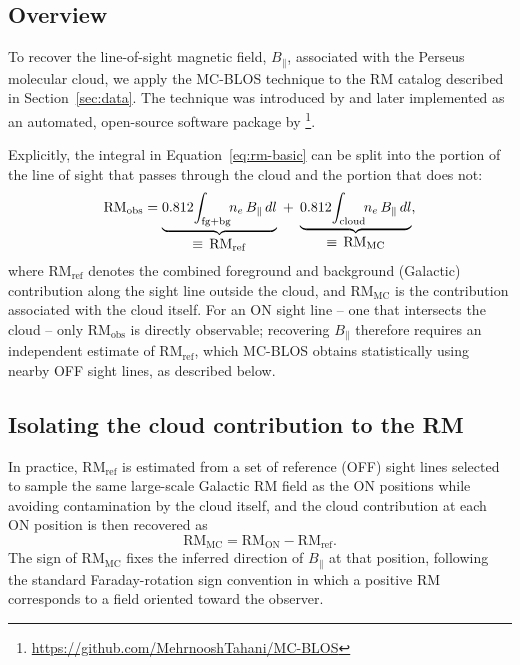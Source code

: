 \documentclass[twocolumn]{aastex631}
\begin{document}
\subsection{Overview}

To recover the line-of-sight magnetic field, $B_\parallel$, associated with the Perseus molecular cloud, we apply the MC-BLOS technique to the RM catalog described in Section~\ref{sec:data}. The technique was introduced by \citet{tahani2018} and later implemented as an automated, open-source software package by \citet{tahani2025mcblos}\footnote{\url{https://github.com/MehrnooshTahani/MC-BLOS}}.

Explicitly, the integral in Equation~\ref{eq:rm-basic} can be split into the portion of the line of sight that passes through the cloud and the portion that does not:
\begin{equation}
\label{eq:rm-split}
    \mathrm{RM_{obs}} = \underbrace{0.812\!\int_{\rm fg+bg}\!\! n_e\, B_\parallel \, dl}_{\displaystyle \equiv\, \mathrm{RM_{ref}}} \;+\; \underbrace{0.812\!\int_{\rm cloud}\!\! n_e\, B_\parallel \, dl}_{\displaystyle \equiv\, \mathrm{RM_{MC}}},
\end{equation}
where $\mathrm{RM_{ref}}$ denotes the combined foreground and background (Galactic) contribution along the sight line outside the cloud, and $\mathrm{RM_{MC}}$ is the contribution associated with the cloud itself. For an ON sight line -- one that intersects the cloud -- only $\mathrm{RM_{obs}}$ is directly observable; recovering $B_\parallel$ therefore requires an independent estimate of $\mathrm{RM_{ref}}$, which MC-BLOS obtains statistically using nearby OFF sight lines, as described below.

\subsection{Isolating the cloud contribution to the RM}
\label{sec:method-rmref}

In practice, $\mathrm{RM_{ref}}$ is estimated from a set of reference (OFF) sight lines selected to sample the same large-scale Galactic RM field as the ON positions while avoiding contamination by the cloud itself, and the cloud contribution at each ON position is then recovered as
\begin{equation}
    \mathrm{RM_{MC}} = \mathrm{RM_{ON}} - \mathrm{RM_{ref}}.
\end{equation}
The sign of $\mathrm{RM_{MC}}$ fixes the inferred direction of $B_\parallel$ at that position, following the standard Faraday-rotation sign convention in which a positive RM corresponds to a field oriented toward the observer.
\end{document}
